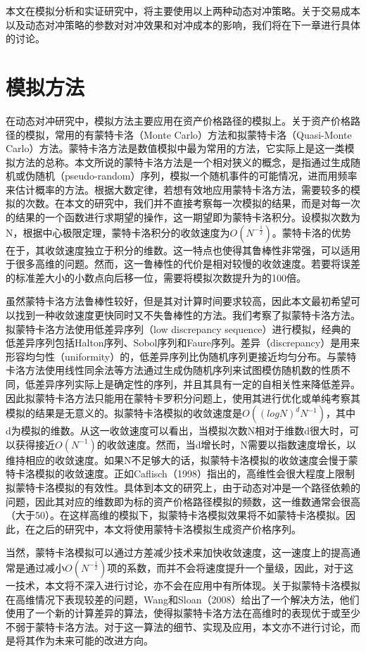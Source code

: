 本文在模拟分析和实证研究中，将主要使用以上两种动态对冲策略。关于交易成本以及动态对冲策略的参数对对冲效果和对冲成本的影响，我们将在下一章进行具体的讨论。

\section{模拟方法}

在动态对冲研究中，模拟方法主要应用在资产价格路径的模拟上。关于资产价格路径的模拟，常用的有蒙特卡洛（Monte Carlo）方法和拟蒙特卡洛（Quasi-Monte Carlo）方法。蒙特卡洛方法是数值模拟中最为常用的方法，它实际上是这一类模拟方法的总称。本文所说的蒙特卡洛方法是一个相对狭义的概念，是指通过生成随机或伪随机（pseudo-random）序列，模拟一个随机事件的可能情况，进而用频率来估计概率的方法。根据大数定律，若想有效地应用蒙特卡洛方法，需要较多的模拟的次数。在本文的研究中，我们并不直接考察每一次模拟的结果，而是对每一次的结果的一个函数进行求期望的操作，这一期望即为蒙特卡洛积分。设模拟次数为N，根据中心极限定理，蒙特卡洛积分的收敛速度为$O(N^{-\frac{1}{2}})$。蒙特卡洛的优势在于，其收敛速度独立于积分的维数。这一特点也使得其鲁棒性非常强，可以适用于很多高维的问题。然而，这一鲁棒性的代价是相对较慢的收敛速度。若要将误差的标准差大小的小数点向后移一位，需要将模拟次数提升为的100倍。

虽然蒙特卡洛方法鲁棒性较好，但是其对计算时间要求较高，因此本文最初希望可以找到一种收敛速度更快同时又不失鲁棒性的方法。我们考察了拟蒙特卡洛方法。拟蒙特卡洛方法使用低差异序列（low discrepancy sequence）进行模拟，经典的低差异序列包括Halton序列、Sobol序列和Faure序列。差异（discrepancy）是用来形容均匀性（uniformity）的，低差异序列比伪随机序列更接近均匀分布。与蒙特卡洛方法使用线性同余法等方法通过生成伪随机序列来试图模仿随机数的性质不同，低差异序列实际上是确定性的序列，并且其具有一定的自相关性来降低差异。因此拟蒙特卡洛方法只能用在蒙特卡罗积分问题上，使用其进行优化或单纯考察其模拟的结果是无意义的。拟蒙特卡洛模拟的收敛速度是$O((logN)^{d}N^{-1})$，其中d为模拟的维数。从这一收敛速度可以看出，当模拟次数N相对于维数d很大时，可以获得接近$O(N^{-1})$的收敛速度。然而，当d增长时，N需要以指数速度增长，以维持相应的收敛速度。如果N不足够大的话，拟蒙特卡洛模拟的收敛速度会慢于蒙特卡洛模拟的收敛速度。正如Caflisch（1998）\cite{caflisch1998monte}指出的，高维性会很大程度上限制拟蒙特卡洛模拟的有效性。具体到本文的研究上，由于动态对冲是一个路径依赖的问题，因此其对应的维数即为标的资产价格路径模拟的频数，这一维数通常会很高（大于50）。在这样高维的模拟下，拟蒙特卡洛模拟效果将不如蒙特卡洛模拟。因此，在之后的研究中，本文将使用蒙特卡洛模拟生成资产价格序列。

当然，蒙特卡洛模拟可以通过方差减少技术来加快收敛速度，这一速度上的提高通常是通过减小$O(N^{-\frac{1}{2}})$项的系数，而并不会将速度提升一个量级，因此，对于这一技术，本文将不深入进行讨论，亦不会在应用中有所体现。关于拟蒙特卡洛模拟在高维情况下表现较差的问题，Wang和Sloan（2008）\cite{wang2008low}给出了一个解决方法，他们使用了一个新的计算差异的算法，使得拟蒙特卡洛方法在高维时的表现优于或至少不弱于蒙特卡洛方法。对于这一算法的细节、实现及应用，本文亦不进行讨论，而是将其作为未来可能的改进方向。

